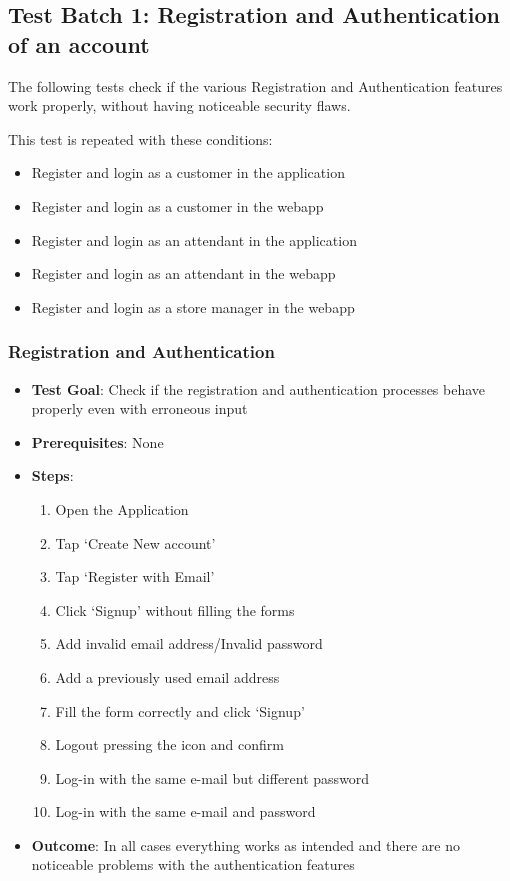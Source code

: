 \subsection{Test Batch 1: Registration and Authentication of an account}
The following tests check if the various Registration and Authentication features work properly, without having noticeable security flaws.

This test is repeated with these conditions:
\begin{itemize}
    \item Register and login as a customer in the application
    \item Register and login as a customer in the webapp
    \item Register and login as an attendant in the application
    \item Register and login as an attendant in the webapp
    \item Register and login as a store manager in the webapp
\end{itemize}
\subsubsection{Registration and Authentication}
\begin{itemize}
    \item \textbf{Test Goal}: Check if the registration and authentication processes behave properly even with erroneous input
    \item \textbf{Prerequisites}: None
    \item \textbf{Steps}:
          \begin{enumerate}
              \item Open the Application
              \item Tap `Create New account'
              \item Tap `Register with Email'
              \item Click `Signup' without filling the forms
              \item Add invalid email address/Invalid password
              \item Add a previously used email address
              \item Fill the form correctly and click `Signup'
              \item Logout pressing the icon and confirm
              \item Log-in with the same e-mail but different password
              \item Log-in with the same e-mail and password
          \end{enumerate}
    \item \textbf{Outcome}: In all cases everything works as intended and there are no noticeable problems with the authentication features
\end{itemize}


